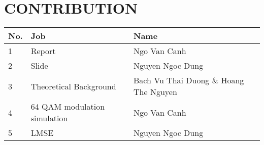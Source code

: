 \section*{CONTRIBUTION}
 {}

\begin{table}[!ht]
\begin{tabular}{|l|l|l|}
    \hline
    \textbf{No.}    & \textbf{Job}      & \textbf{Name} \\ \hline
    1 & Report & Ngo Van Canh  \\ \hline
    2 & Slide & Nguyen Ngoc Dung \\ \hline
    3 & Theoretical Background & Bach Vu Thai Duong \& Hoang The Nguyen \\ \hline
    4 & 64 QAM modulation simulation & Ngo Van Canh \\ \hline
    5 & LMSE & Nguyen Ngoc Dung \\ \hline
\end{tabular}
\end{table}

\newpage